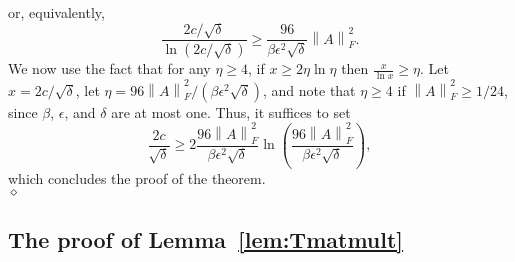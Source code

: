 \documentclass[11pt]{article}
\newcommand{\FNormS}[1]{\mbox{}\left\|#1\right\|_F^2}
\newenvironment{Proof}{\noindent {\em Proof:}}{\\\hspace*{\fill}\mbox{$\diamond$}}
\begin{document}
\begin{Proof}
or, equivalently,
$$\frac{2c/\sqrt{\delta}}{\ln \left(2c/\sqrt{\delta}\right)} \geq \frac{96}{\beta\epsilon^2\sqrt{\delta}}\FNormS{A}.$$
We now use the fact that for any $\eta \geq 4$, if $x \geq 2\eta \ln \eta$ then $\frac{x}{\ln x} \geq \eta$. Let $x = 2c/\sqrt{\delta}$, let $\eta = 96 \FNormS{A}/\left(\beta \epsilon^2\sqrt{\delta}\right)$, and note that $\eta \geq 4$ if $\FNormS{A} \geq 1/24$, since $\beta$, $\epsilon$, and $\delta$ are at most one. Thus, it suffices to set
$$\frac{2c}{\sqrt{\delta}} \geq 2 \frac{96 \FNormS{A}}{\beta \epsilon^2\sqrt{\delta}}\ln \left(\frac{96 \FNormS{A}}{\beta \epsilon^2\sqrt{\delta}}\right),$$
which concludes the proof of the theorem.
\end{Proof}

\subsection{The proof of Lemma~\ref{lem:Tmatmult}}\label{sxn:pf_of_technical_lemma}
\end{document}
